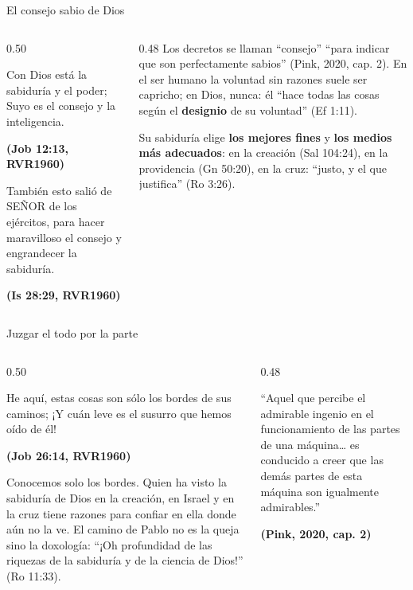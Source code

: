 \documentclass[hyperref={bookmarks=false},aspectratio=169]{beamer}
\newcommand{\SENOR}{S{\fontsize{0.78em}{1em}\selectfont EÑOR}}
\newcommand{\fuente}[1]{\par\hfill{\upshape\bfseries\footnotesize\textcolor{azul}{#1}}}
\newcommand{\destacar}[1]{\textbf{\textcolor{azul}{#1}}}
\begin{document}
\begin{frame}{El consejo sabio de Dios}
\begin{columns}[t,onlytextwidth]
\begin{column}{0.50\textwidth}
\begin{cita}[fontupper=\scriptsize\itshape]Con Dios está la sabiduría y el poder; Suyo es el consejo y la inteligencia.\fuente{(Job 12:13, RVR1960)}\end{cita}
\begin{cita}[fontupper=\scriptsize\itshape]También esto salió de \SENOR{} de los ejércitos, para hacer maravilloso el consejo y engrandecer la sabiduría.\fuente{(Is 28:29, RVR1960)}\end{cita}
\end{column}
\begin{column}{0.48\textwidth}\scriptsize
Los decretos se llaman ``consejo'' ``para indicar que son perfectamente sabios'' (Pink, 2020, cap. 2). En el ser humano la voluntad sin razones suele ser capricho; en Dios, nunca: él ``hace todas las cosas según el \destacar{designio} de su voluntad'' (Ef 1:11).\par\medskip
Su sabiduría elige \destacar{los mejores fines} y \destacar{los medios más adecuados}: en la creación (Sal 104:24), en la providencia (Gn 50:20), en la cruz: ``justo, y el que justifica'' (Ro 3:26).
\end{column}
\end{columns}
\end{frame}

\begin{frame}{Juzgar el todo por la parte}
\begin{columns}[t,onlytextwidth]
\begin{column}{0.50\textwidth}
\begin{cita}[fontupper=\scriptsize\itshape]He aquí, estas cosas son sólo los bordes de sus caminos; ¡Y cuán leve es el susurro que hemos oído de él!\fuente{(Job 26:14, RVR1960)}\end{cita}
\scriptsize Conocemos solo los bordes. Quien ha visto la sabiduría de Dios en la creación, en Israel y en la cruz tiene razones para confiar en ella donde aún no la ve. El camino de Pablo no es la queja sino la doxología: ``¡Oh profundidad de las riquezas de la sabiduría y de la ciencia de Dios!'' (Ro 11:33).
\end{column}
\begin{column}{0.48\textwidth}
\begin{tcolorbox}[colback=papiro,colframe=dorado,boxrule=1.2pt,arc=3pt]
\scriptsize ``Aquel que percibe el admirable ingenio en el funcionamiento de las partes de una máquina\ldots{} es conducido a creer que las demás partes de esta máquina son igualmente admirables.''\par\hfill{\upshape\bfseries(Pink, 2020, cap. 2)}
\end{tcolorbox}
\end{column}
\end{columns}
\end{frame}
\end{document}
